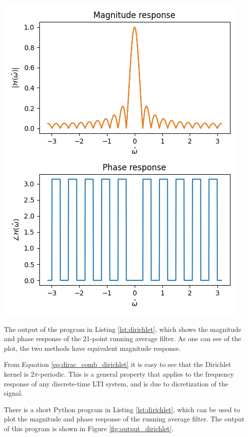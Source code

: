 \begin{marginfigure}
\begin{center}
\includegraphics[width=\textwidth]{code/019_frequency_response/dirichlet21.png}
\end{center}
\caption{The output of the program in Listing \ref{lst:dirichlet}, which shows the magnitude and phase response of the 21-point running average filter. As one can see of the plot, the two methods have equivalent magnitude response.}
\label{fig:output_dirichlet}
\end{marginfigure}

From Equation \ref{eq:dirac_comb_dirichlet} it is easy to see that the Dirichlet kernel is $2\pi$-periodic. This is a general property that
applies to the frequency response of any discrete-time LTI system,
and is due to dicretization of the signal.

There is a short Python program in Listing \ref{lst:dirichlet}, which
can be used to plot the magnitude and phase response of the running
average filter. The output of this program is shown in
Figure \ref{fig:output_dirichlet}.



